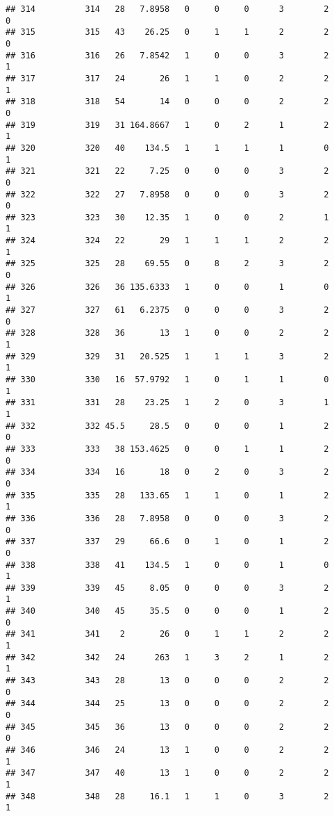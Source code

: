 \documentclass[
]{article}
\begin{document}
\begin{verbatim}
## 314          314   28   7.8958   0     0     0      3        2         0
## 315          315   43    26.25   0     1     1      2        2         0
## 316          316   26   7.8542   1     0     0      3        2         1
## 317          317   24       26   1     1     0      2        2         1
## 318          318   54       14   0     0     0      2        2         0
## 319          319   31 164.8667   1     0     2      1        2         1
## 320          320   40    134.5   1     1     1      1        0         1
## 321          321   22     7.25   0     0     0      3        2         0
## 322          322   27   7.8958   0     0     0      3        2         0
## 323          323   30    12.35   1     0     0      2        1         1
## 324          324   22       29   1     1     1      2        2         1
## 325          325   28    69.55   0     8     2      3        2         0
## 326          326   36 135.6333   1     0     0      1        0         1
## 327          327   61   6.2375   0     0     0      3        2         0
## 328          328   36       13   1     0     0      2        2         1
## 329          329   31   20.525   1     1     1      3        2         1
## 330          330   16  57.9792   1     0     1      1        0         1
## 331          331   28    23.25   1     2     0      3        1         1
## 332          332 45.5     28.5   0     0     0      1        2         0
## 333          333   38 153.4625   0     0     1      1        2         0
## 334          334   16       18   0     2     0      3        2         0
## 335          335   28   133.65   1     1     0      1        2         1
## 336          336   28   7.8958   0     0     0      3        2         0
## 337          337   29     66.6   0     1     0      1        2         0
## 338          338   41    134.5   1     0     0      1        0         1
## 339          339   45     8.05   0     0     0      3        2         1
## 340          340   45     35.5   0     0     0      1        2         0
## 341          341    2       26   0     1     1      2        2         1
## 342          342   24      263   1     3     2      1        2         1
## 343          343   28       13   0     0     0      2        2         0
## 344          344   25       13   0     0     0      2        2         0
## 345          345   36       13   0     0     0      2        2         0
## 346          346   24       13   1     0     0      2        2         1
## 347          347   40       13   1     0     0      2        2         1
## 348          348   28     16.1   1     1     0      3        2         1

\end{verbatim}
\end{document}
